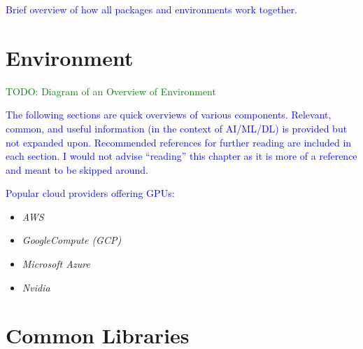 

\textcolor{blue}{Brief overview of how all packages and environments work together.}

\chapter{Environment}

\textcolor{green}{TODO: Diagram of an Overview of Environment}

\textcolor{blue}{The following sections are quick overviews of various components. Relevant, common, and useful information (in the context of AI/ML/DL) is provided but not expanded upon. Recommended references for further reading are included in each section. I would not advise ``reading'' this chapter as it is more of a reference and meant to be skipped around.}


\textcolor{blue}{Popular cloud providers offering GPUs:}

\begin{itemize}
	\item \emph{AWS}~\cite{cloudHW_amazon_aws}
	\item \emph{GoogleCompute (GCP)}~\cite{cloudHW_google_cloud}
	\item \emph{Microsoft Azure}~\cite{cloudHW_micro_azure} 
	\item \emph{Nvidia}~\cite{cloudHW_nvidia_cloud}
\end{itemize}

\chapter{Common Libraries}


